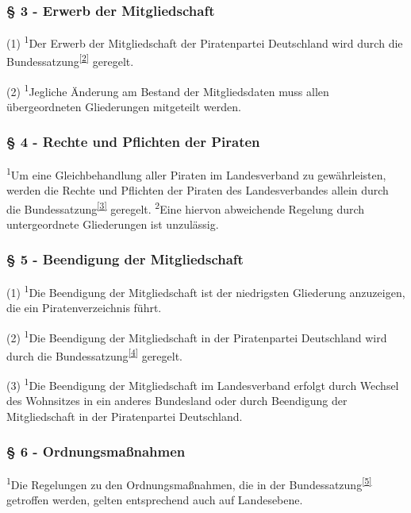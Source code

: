 \subsubsection{§ 3 - Erwerb der Mitgliedschaft}

(1) \textsuperscript{1}Der Erwerb der Mitgliedschaft der Piratenpartei
Deutschland wird durch die
Bundessatzung\textsuperscript{\href{\#cite\_note-1}{{[}2{]}}} geregelt.

(2) \textsuperscript{1}Jegliche Änderung am Bestand der Mitgliedsdaten
muss allen übergeordneten Gliederungen mitgeteilt werden.

\subsubsection{§ 4 - Rechte und Pflichten der Piraten}

\textsuperscript{1}Um eine Gleichbehandlung aller Piraten im
Landesverband zu gewährleisten, werden die Rechte und Pflichten der
Piraten des Landesverbandes allein durch die
Bundessatzung\textsuperscript{\href{\#cite\_note-2}{{[}3{]}}} geregelt.
\textsuperscript{2}Eine hiervon abweichende Regelung durch
untergeordnete Gliederungen ist unzulässig.

\subsubsection{§ 5 - Beendigung der Mitgliedschaft}

(1) \textsuperscript{1}Die Beendigung der Mitgliedschaft ist der
niedrigsten Gliederung anzuzeigen, die ein Piratenverzeichnis führt.

(2) \textsuperscript{1}Die Beendigung der Mitgliedschaft in der
Piratenpartei Deutschland wird durch die
Bundessatzung\textsuperscript{\href{\#cite\_note-3}{{[}4{]}}} geregelt.

(3) \textsuperscript{1}Die Beendigung der Mitgliedschaft im
Landesverband erfolgt durch Wechsel des Wohnsitzes in ein anderes
Bundesland oder durch Beendigung der Mitgliedschaft in der Piratenpartei
Deutschland.

\subsubsection{§ 6 - Ordnungsmaßnahmen}

\textsuperscript{1}Die Regelungen zu den Ordnungsmaßnahmen, die in der
Bundessatzung\textsuperscript{\href{\#cite\_note-4}{{[}5{]}}} getroffen
werden, gelten entsprechend auch auf Landesebene.

